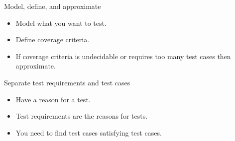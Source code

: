 \documentclass{beamer}
\begin{document}
\begin{frame}{Model, define, and approximate}
  \begin{itemize}
  \item Model what you want to test.
  \item Define coverage criteria.
  \item If coverage criteria is undecidable or requires too many test
    cases then approximate. 
  \end{itemize}
 \end{frame}
\begin{frame}{Separate test requirements and test cases}
  \begin{itemize}
  \item Have a reason for a test.
  \item Test requirements are the reasons for tests.
  \item You need to find test cases satisfying test cases. 
  \end{itemize}
 
\end{frame}
\end{document}
